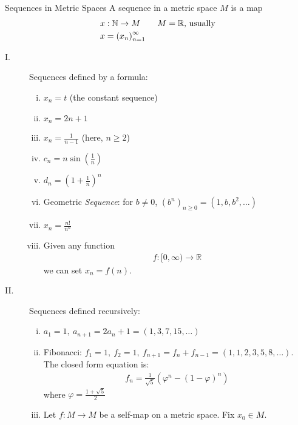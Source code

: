 \documentclass[8pt]{extarticle}
\newcommand{\N}{\mathbb{N}}
\newcommand{\R}{\mathbb{R}}
\begin{document}
  \begin{problem}{Sequences in Metric Spaces}
    A sequence in a metric space $M$ is a map
    \begin{align*}
      x&: \N \rightarrow M \tag*{$M = \R$, usually}\\
      x &= \left(x_n\right)_{n=1}^{\infty}
    \end{align*}
    \begin{description}
      \item[I.] Sequences defined by a formula:
        \begin{enumerate}[(i)]
          \item $x_n = t$ (the constant sequence)
          \item $x_n = 2n + 1$
          \item $x_n = \frac{1}{n-1}$ (here, $n \geq 2$)
          \item $c_n = n\sin\left(\frac{1}{n}\right)$
          \item $d_n = \left(1 + \frac{1}{n}\right)^n$
          \item Geometric \textit{Sequence}: for $b\neq 0$, $(b^n)_{n\geq 0} = (1,b,b^2,\dots)$
          \item $x_n = \frac{n!}{n^n}$
          \item Given any function
            \begin{align*}
              f:[0,\infty)\rightarrow\R
            \end{align*}
            we can set $x_n = f(n)$.
        \end{enumerate}
      \item[II.] Sequences defined recursively:
        \begin{enumerate}[(i)]
          \item $a_1 = 1,~a_{n+1}=2a_n + 1 = (1,3,7,15,\dots)$
          \item Fibonacci: $f_1 = 1,~f_2 = 1,~f_{n+1} = f_{n} + f_{n-1} = (1,1,2,3,5,8,\dots)$. The closed form equation is:
            \begin{align*}
              f_n = \frac{1}{\sqrt{5}}\left(\varphi^n - (1-\varphi)^n\right)
            \end{align*}
            where $\varphi = \frac{1 + \sqrt{5}}{2}$
          \item Let $f: M\rightarrow M$ be a self-map on a metric space. Fix $x_0\in M$.\\


\end{enumerate}
\end{description}
\end{problem}
\end{document}
